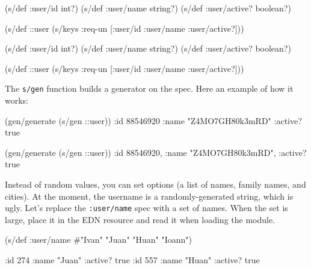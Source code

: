 \ifx\DEVICETYPE\MOBILE

\begin{english}
  \begin{clojure}
(s/def :user/id int?)
(s/def :user/name string?)
(s/def :user/active? boolean?)

(s/def ::user
  (s/keys :req-un [:user/id
                   :user/name
                   :user/active?]))
  \end{clojure}
\end{english}

\else

\begin{english}
  \begin{clojure}
(s/def :user/id int?)
(s/def :user/name string?)
(s/def :user/active? boolean?)

(s/def ::user (s/keys :req-un [:user/id
                               :user/name
                               :user/active?]))
  \end{clojure}
\end{english}

\fi

\noindent
The \verb|s/gen| function builds a generator on the spec. Here an example of how it works:

\ifx\DEVICETYPE\MOBILE

\begin{english}
  \begin{clojure}
(gen/generate (s/gen ::user))
{:id 88546920
 :name "Z4MO7GH80k3mRD"
 :active? true}
  \end{clojure}
\end{english}

\else

\begin{english}
  \begin{clojure}
(gen/generate (s/gen ::user))
{:id 88546920, :name "Z4MO7GH80k3mRD", :active? true}
  \end{clojure}
\end{english}

\fi

Instead of random values, you can set options (a list of names, family names, and cities). At the moment, the username is a randomly-generated string, which is ugly. Let's replace the \texttt{:user\-/name} spec with a set of names. When the set is large, place it in the EDN resource and read it when loading the module.

\ifx\DEVICETYPE\MOBILE

\begin{english}
  \begin{clojure}
(s/def :user/name
  #{"Ivan" "Juan" "Huan" "Ioann"})

{:id 274 :name "Juan" :active? true}
{:id 557 :name "Huan" :active? true}
  \end{clojure}
\end{english}

